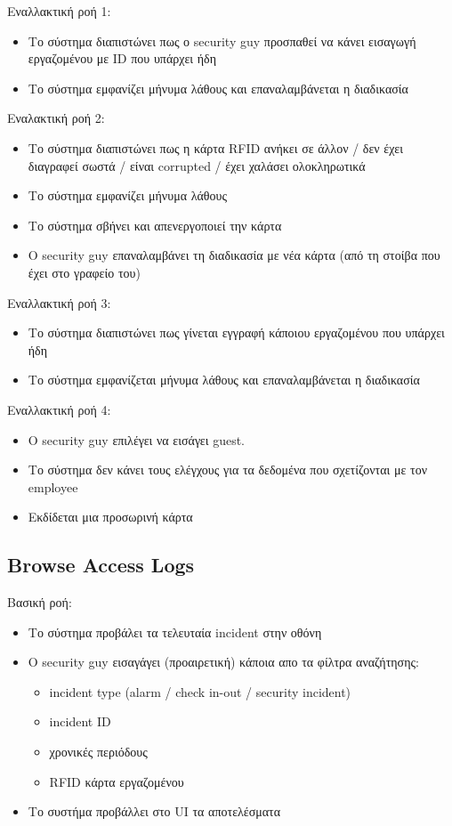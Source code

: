\documentclass{article}
\begin{document}
\noindent Εναλλακτική ροή 1: 
\begin{itemize}
    \item Το σύστημα διαπιστώνει πως ο security guy προσπαθεί να κάνει εισαγωγή εργαζομένου με ID που υπάρχει ήδη
    \item Το σύστημα εμφανίζει μήνυμα λάθους και επαναλαμβάνεται η διαδικασία
\end{itemize}

\noindent Εναλακτική ροή 2:
\begin{itemize}
    \item Το σύστημα διαπιστώνει πως η κάρτα RFID ανήκει σε άλλον / δεν έχει διαγραφεί σωστά / είναι corrupted / έχει χαλάσει ολοκληρωτικά
    \item Το σύστημα εμφανίζει μήνυμα λάθους
    \item Το σύστημα σβήνει και απενεργοποιεί την κάρτα
    \item Ο security guy επαναλαμβάνει τη διαδικασία με νέα κάρτα (από τη στοίβα που έχει στο γραφείο του)
\end{itemize}

\noindent Εναλλακτική ροή 3:
\begin{itemize}
    \item Το σύστημα διαπιστώνει πως γίνεται εγγραφή κάποιου εργαζομένου που υπάρχει ήδη
    \item Το σύστημα εμφανίζεται μήνυμα λάθους και επαναλαμβάνεται η διαδικασία
\end{itemize}

\noindent Εναλλακτική ροή 4:
\begin{itemize}
    \item Ο security guy επιλέγει να εισάγει guest.
    \item Το σύστημα δεν κάνει τους ελέγχους για τα δεδομένα που σχετίζονται με τον employee
    \item Εκδίδεται μια προσωρινή κάρτα
\end{itemize}


\subsection{Browse Access Logs}

\noindent Βασική ροή:
\begin{itemize}
    \item Το σύστημα προβάλει τα τελευταία incident στην οθόνη
    \item O security guy εισαγάγει (προαιρετική) κάποια απο τα φίλτρα αναζήτησης:
    \begin{itemize}
        \item incident type (alarm / check in-out / security incident)
        \item incident ID
        \item χρονικές περιόδους
        \item RFID κάρτα εργαζομένου
    \end{itemize}
    \item Το συστήμα προβάλλει στο UI τα αποτελέσματα
\end{itemize}
\end{document}
